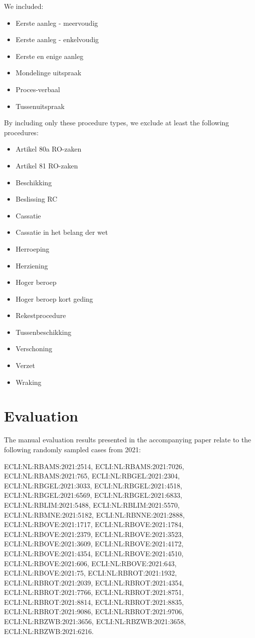 \documentclass[a4paper]{article}
\begin{document}
We included:

\begin{itemize}
    \item Eerste aanleg - meervoudig
    \item Eerste aanleg - enkelvoudig
    \item Eerste en enige aanleg
    \item Mondelinge uitspraak
    \item Proces-verbaal
    \item Tussenuitspraak
\end{itemize}

By including only these procedure types, we exclude at least the following procedures:

\begin{itemize}
    \item Artikel 80a RO-zaken          
    \item Artikel 81 RO-zaken
    \item Beschikking
    \item Beslissing RC                 
    \item Cassatie
    \item Cassatie in het belang der wet
    \item Herroeping                    
    \item Herziening                    
    \item Hoger beroep
    \item Hoger beroep kort geding      
    \item Rekestprocedure               
    \item Tussenbeschikking             
    \item Verschoning                   
    \item Verzet                        
    \item Wraking
\end{itemize}

\section{Evaluation}

The manual evaluation results presented in the accompanying paper relate to the following randomly sampled cases from 2021:

ECLI:NL:RBAMS:2021:2514, ECLI:NL:RBAMS:2021:7026, ECLI:NL:RBAMS:2021:765, ECLI:NL:RBGEL:2021:2304, ECLI:NL:RBGEL:2021:3033, ECLI:NL:RBGEL:2021:4518, ECLI:NL:RBGEL:2021:6569, ECLI:NL:RBGEL:2021:6833, ECLI:NL:RBLIM:2021:5488, ECLI:NL:RBLIM:2021:5570, ECLI:NL:RBMNE:2021:5182, ECLI:NL:RBNNE:2021:2888, ECLI:NL:RBOVE:2021:1717, ECLI:NL:RBOVE:2021:1784, ECLI:NL:RBOVE:2021:2379, ECLI:NL:RBOVE:2021:3523, ECLI:NL:RBOVE:2021:3609, ECLI:NL:RBOVE:2021:4172, ECLI:NL:RBOVE:2021:4354, ECLI:NL:RBOVE:2021:4510, ECLI:NL:RBOVE:2021:606, ECLI:NL:RBOVE:2021:643, ECLI:NL:RBOVE:2021:75, ECLI:NL:RBROT:2021:1932, ECLI:NL:RBROT:2021:2039, ECLI:NL:RBROT:2021:4354, ECLI:NL:RBROT:2021:7766, ECLI:NL:RBROT:2021:8751, ECLI:NL:RBROT:2021:8814, ECLI:NL:RBROT:2021:8835, ECLI:NL:RBROT:2021:9086, ECLI:NL:RBROT:2021:9706, ECLI:NL:RBZWB:2021:3656, ECLI:NL:RBZWB:2021:3658, ECLI:NL:RBZWB:2021:6216.
\end{document}
